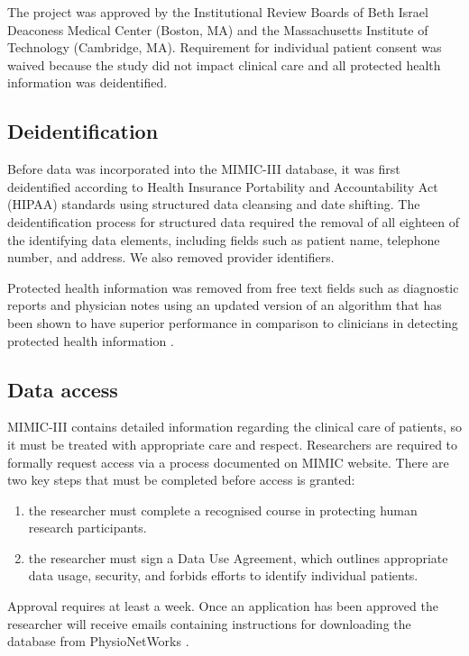 \documentclass[english]{article}
\begin{document}
The project was approved by the Institutional Review Boards of Beth Israel Deaconess Medical Center (Boston, MA) and the Massachusetts Institute of Technology (Cambridge, MA). Requirement for individual patient consent was waived because the study did not impact clinical care and all protected health information was deidentified.

\subsection*{Deidentification}

Before data was incorporated into the MIMIC-III database, it was first deidentified according to Health Insurance Portability and Accountability Act (HIPAA) standards using structured data cleansing and date shifting. The deidentification process for structured data required the removal of all eighteen of the identifying data elements, including fields such as patient name, telephone number, and address. We also removed provider identifiers.

Protected health information was removed from free text fields such as diagnostic reports and physician notes using an updated version of an algorithm that has been shown to have superior performance in comparison to clinicians in detecting protected health information \cite{cite5}.

\subsection*{Data access}

MIMIC-III contains detailed information regarding the clinical care of patients, so it must be treated with appropriate care and respect. Researchers are required to formally request access via a process documented on MIMIC website. There are two key steps that must be completed before access is granted:

\begin{enumerate}
  \item the researcher must complete a recognised course in protecting human research participants.
  \item the researcher must sign a Data Use Agreement, which outlines appropriate data usage, security, and forbids efforts to identify individual patients.
\end{enumerate}

Approval requires at least a week. Once an application has been approved the researcher will receive emails containing instructions for downloading the database from PhysioNetWorks \cite{cite6}. 
\end{document}
